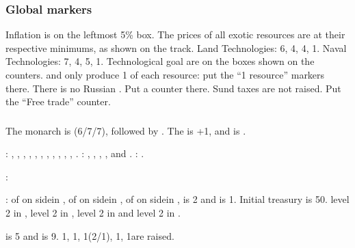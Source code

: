 \subsubsection{Global markers}
\aparag Inflation is on the leftmost 5\% box.
\aparag The prices of all exotic resources are at their respective minimums,
as shown on the track.
\aparag Land Technologies:  6,  4, 
4,  1. Naval Technologies:  7,  4,
 5,  1.
\bparag Technological goal are on the boxes shown on the counters.
\aparag \granderegionKarnatika and \granderegionBengale only produce 1 of each
resource: put the ``1 resource'' markers there.
\aparag There is no Russian \CTZ. Put a counter there.
\aparag Sund taxes are not raised. Put the ``Free trade'' counter.

\subsubsection{\paysmajeurAngleterre}
\aparag The monarch is  (6/7/7), followed by
. The \STAB is +1, and \ANG is .

: \provinceCumberland, \provinceDurham,
\provinceYorkshire, \provinceLancashire, \provinceCymru, \provinceMidlands,
\provinceLincolnshire, , \provinceGloucester,
\provinceCornwall, \provinceWessex, \provinceKent.
: \provinceConnacht, \provinceMumhan,
\provinceLaighean, \provinceBrega, \provinceUladh and \provinceCalais.
: \seazoneAcores.

:
\begin{modlist}
\item[\VASSAL] \paysEcosse
\end{modlist}

:
\bparag \MNU of  on side\facemoins in \provinceMidlands, \MNU of
 on side\facemoins in , \MNU of  on
side\facemoins in \provinceWessex, \FTI is 2 and \DTI is 1.
\bparag Initial treasury is 50\ducats.
\bparag \TradeFLEET level 2 in , level 2 in , level
2 in  and level 2 in .

\aparag {} is 5 and  is
9. 1\ARMY\facemoins, 1\LD, 1\FLEET\facemoins (2\NWD/1\NTD), 1\ND, 1\NTD are
raised.


